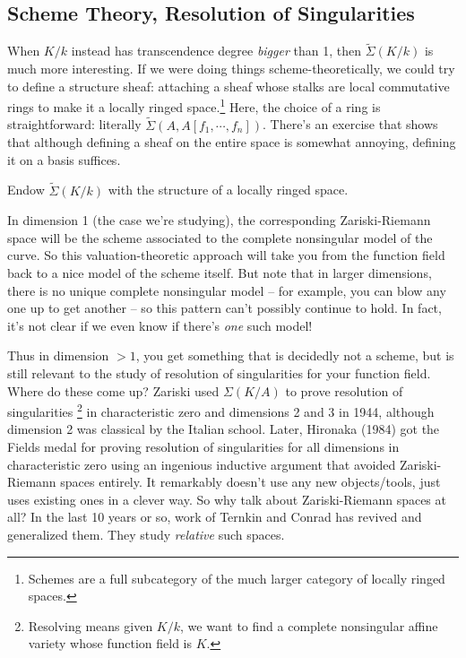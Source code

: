\hypertarget{scheme-theory-resolution-of-singularities}{%
\subsection{Scheme Theory, Resolution of
Singularities}\label{scheme-theory-resolution-of-singularities}}

When \(K/k\) instead has transcendence degree \emph{bigger} than 1, then
\(\tilde \Sigma(K/k)\) is much more interesting. If we were doing things
scheme-theoretically, we could try to define a structure sheaf:
attaching a sheaf whose stalks are local commutative rings to make it a
locally ringed space.\footnote{Schemes are a full subcategory of the
  much larger category of locally ringed spaces.} Here, the choice of a
ring is straightforward: literally
\(\tilde \Sigma(A, A[f_1, \cdots, f_n])\). There's an exercise that
shows that although defining a sheaf on the entire space is somewhat
annoying, defining it on a basis suffices.

\begin{exercise}[?]

Endow \(\tilde \Sigma(K/k)\) with the structure of a locally ringed
space.

\end{exercise}

\begin{remark}

In dimension 1 (the case we're studying), the corresponding
Zariski-Riemann space will be the scheme associated to the complete
nonsingular model of the curve. So this valuation-theoretic approach
will take you from the function field back to a nice model of the scheme
itself. But note that in larger dimensions, there is no unique complete
nonsingular model -- for example, you can blow any one up to get another
-- so this pattern can't possibly continue to hold. In fact, it's not
clear if we even know if there's \emph{one} such model!

\end{remark}

\begin{remark}

Thus in dimension \(>1\), you get something that is decidedly not a
scheme, but is still relevant to the study of resolution of
singularities for your function field. Where do these come up? Zariski
used \(\Sigma(K/A)\) to prove resolution of singularities \footnote{Resolving
  means given \(K/k\), we want to find a complete nonsingular affine
  variety whose function field is \(K\).} in characteristic zero and
dimensions 2 and 3 in 1944, although dimension 2 was classical by the
Italian school. Later, Hironaka (1984) got the Fields medal for proving
resolution of singularities for all dimensions in characteristic zero
using an ingenious inductive argument that avoided Zariski-Riemann
spaces entirely. It remarkably doesn't use any new objects/tools, just
uses existing ones in a clever way. So why talk about Zariski-Riemann
spaces at all? In the last 10 years or so, work of Ternkin and Conrad
has revived and generalized them. They study \emph{relative} such
spaces.

\end{remark}

